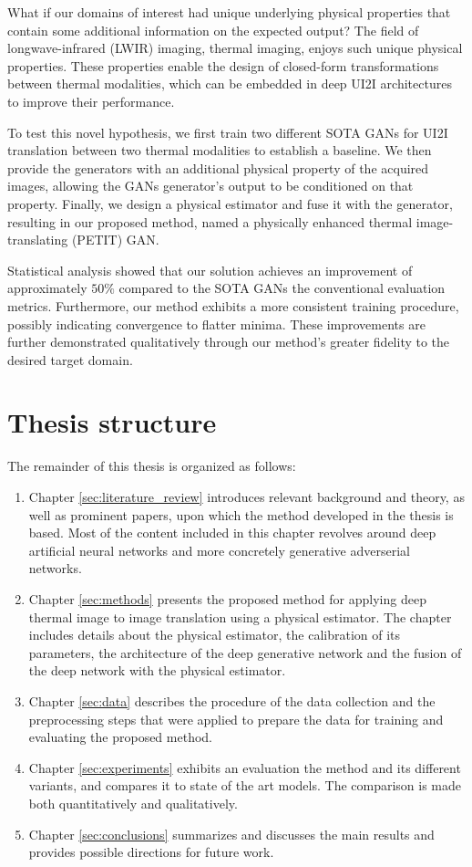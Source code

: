 What if our domains of interest had unique underlying physical properties that contain some additional information on the expected output?
The field of longwave-infrared (LWIR) imaging, \aka thermal imaging, enjoys such unique physical properties.
These properties enable the design of closed-form transformations between thermal modalities, which can be embedded in deep UI2I architectures to improve their performance.

To test this novel hypothesis, we first train two different SOTA GANs for UI2I translation between two thermal modalities to establish a baseline.
We then provide the generators with an additional physical property of the acquired images, allowing the GANs generator's output to be conditioned on that property.
Finally, we design a physical estimator and fuse it with the generator, resulting in our proposed method, named a physically enhanced thermal image-translating (PETIT) GAN.

Statistical analysis showed that our solution achieves an improvement of approximately $50\%$ compared to the SOTA GANs \wrt the conventional evaluation metrics.
Furthermore, our method exhibits a more consistent training procedure, possibly indicating convergence to flatter minima.
These improvements are further demonstrated qualitatively through our method's greater fidelity to the desired target domain.

\section{Thesis structure}
The remainder of this thesis is organized as follows: 
\begin{enumerate}
    \item Chapter \ref{sec:literature_review} introduces relevant background and theory, as well as prominent papers, upon which the method developed in the thesis is based. 
    Most of the content included in this chapter revolves around deep artificial neural networks and more concretely generative adverserial networks.
    \item Chapter \ref{sec:methods} presents the proposed method for applying deep thermal image to image translation using a physical estimator. The chapter includes details about the physical estimator, the calibration of its parameters, the architecture of the deep generative network and the fusion of the deep network with the physical estimator.
    \item Chapter \ref{sec:data} describes the procedure of the data collection and the preprocessing steps that were applied to prepare the data for training and evaluating the proposed method.
    \item Chapter \ref{sec:experiments} exhibits an evaluation the method and its different variants, and compares it to state of the art models. The comparison is made both quantitatively and qualitatively.
    \item Chapter \ref{sec:conclusions} summarizes and discusses the main results and provides possible directions for future work.
\end{enumerate}




